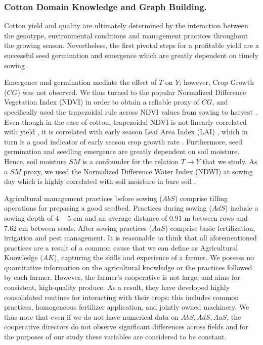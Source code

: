 \documentclass[letterpaper]{article} %
\begin{document}
\subsubsection{Cotton Domain Knowledge and Graph Building.}

Cotton yield and quality are ultimately determined by the interaction between the genotype, environmental conditions and management practices throughout the growing season. Nevertheless, the first pivotal steps for a profitable yield are a successful seed germination and emergence which are greatly dependent on timely sowing \cite{wanjura1969emergence, bauer1998planting,  bradow2010germination}.

Emergence and germination mediate the effect of $T$ on $Y$; however, Crop Growth ($CG$) was not observed. We thus turned to the popular Normalized Difference Vegetation Index (NDVI) in order to obtain a reliable proxy of $CG$, and specifically used the trapezoidal rule across NDVI values from sowing to harvest %
\cite{eklundh2015timesat}. Even though in the case of cotton, trapezoidal NDVI is not linearly correlated with yield \cite{dalezios2001cotton, zhao2007canopy}, it is correlated with early season Leaf Area Index (LAI) \cite{zhao2007canopy}, which in turn is a good indicator of early season crop growth rate \cite{virk2019physiological}.
Furthermore, seed germination and seedling emergence are greatly dependent on soil moisture. Hence, soil moisture $SM$ is a confounder for the relation $T \rightarrow Y$ that we study. As a $SM$ proxy, we used the Normalized Difference Water Index (NDWI) at sowing day which is highly correlated with soil moisture in bare soil \cite{casamitjana2020soil}.

Agricultural management practices before sowing ($AbS$) comprise tilling operations for preparing a good seedbed. Practices during sowing ($AdS$) include a sowing depth of $4-5$ cm and an average distance of $0.91$ m between rows and $7.62$ cm between seeds. After sowing practices ($AaS$) comprise basic fertilization, irrigation and pest management. It is reasonable to think that all aforementioned practices are a result of a common cause that we can define as Agricultural Knowledge ($AK$), capturing the skills and experience of a farmer. We possess no quantitative information on the agricultural knowledge or the practices followed by each farmer. However, the farmer's cooperative is not large, and aims for consistent, high-quality produce. As a result, they have developed highly consolidated routines for interacting with their crops: this includes common practices, homogeneous fertilizer application, and jointly owned machinery. We thus note that even if we do not have numerical data on $AbS, AdS, AaS$, the cooperative directors do not observe significant differences across fields and for the purposes of our study these variables are considered to be constant.
\end{document}
